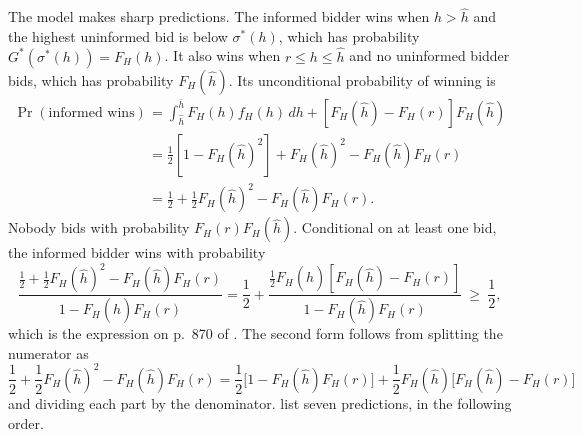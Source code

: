 The model makes sharp predictions. The informed bidder wins when $h>\hat h$ and the highest uninformed bid is
below $\sigma^*(h)$, which has probability $G^*(\sigma^*(h))=F_H(h)$. It also wins when $r\le h\le\hat h$ and
no uninformed bidder bids, which has probability $F_H(\hat h)$. Its unconditional probability of winning is
\begin{align*}
  \Pr(\text{informed wins})
  &=\int_{\hat h}^{\bar h}F_H(h)f_H(h)\,dh+\left[F_H(\hat h)-F_H(r)\right]F_H(\hat h)\\
  &=\frac{1}{2}\left[1-F_H(\hat h)^2\right]+F_H(\hat h)^2-F_H(\hat h)F_H(r)\\
  &=\frac{1}{2}+\frac{1}{2}F_H(\hat h)^2-F_H(\hat h)F_H(r).
\end{align*}
Nobody bids with probability $F_H(r)F_H(\hat h)$. Conditional on at least one bid, the informed bidder wins
with probability
\begin{equation}\label{eq:14-hp-winprob}
  \frac{\frac{1}{2}+\frac{1}{2}F_H(\hat h)^2-F_H(\hat h)F_H(r)}{1-F_H(\hat h)F_H(r)}
  =\frac{1}{2}+\frac{\frac{1}{2}F_H(\hat h)\left[F_H(\hat h)-F_H(r)\right]}{1-F_H(\hat h)F_H(r)}
  \ \ge\ \frac{1}{2},
\end{equation}
which is the expression on p.~870 of \citet{HendricksPorter1988}. The second form follows from splitting
the numerator as
\begin{equation*}
  \frac{1}{2}+\frac{1}{2}F_H(\hat h)^2-F_H(\hat h)F_H(r)=\frac{1}{2}\bigl[1-F_H(\hat h)F_H(r)\bigr]
  +\frac{1}{2}F_H(\hat h)\bigl[F_H(\hat h)-F_H(r)\bigr]
\end{equation*}
and dividing each part by the denominator. \citet[pp.~870--871]{HendricksPorter1988} list seven predictions, in the following order.
